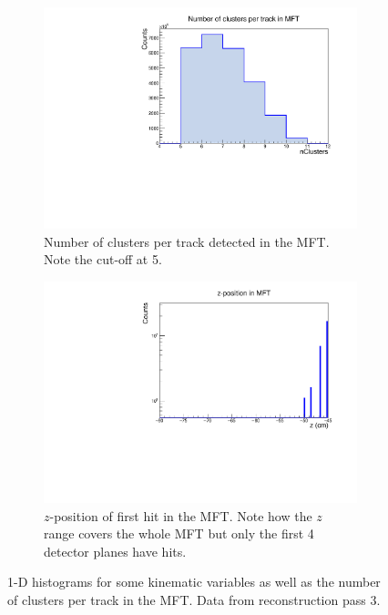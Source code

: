 \begin{figure}[h]
\begin{subfigure}[t]{.49\linewidth}
        \centering
        \includegraphics[width=\linewidth]{Plots/pass3_MFT/nClusters_pass3.pdf}
        \caption{Number of clusters per track detected in the MFT. Note the cut-off at 5.}
        \label{fig:MFTnClusters_pass3}
    \end{subfigure}
    \hfill
    \begin{subfigure}[t]{.49\linewidth}
        \centering
        \includegraphics[width=\linewidth]{Plots/pass3_MFT/Z_MFT_pass3.pdf}
        \caption{$z$-position of first hit in the MFT. Note how the $z$ range covers the whole MFT but only the first 4 detector planes have hits.}
        \label{fig:Z_MFT_pass3}
    \end{subfigure}
\caption[Gistograms of $\eta$, $\varphi$, , and $z$ for tracks from pass 3 in the MFT]{1-D histograms for some kinematic variables as well as the number of clusters per track in the MFT. Data from reconstruction pass 3. }
\label{fig:MFT_1D_pass3}
\end{figure}

